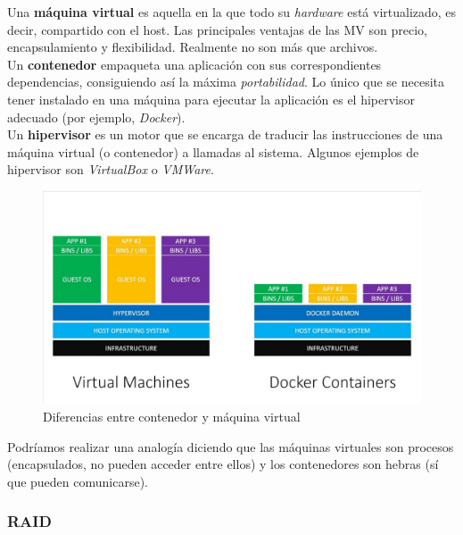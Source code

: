 \documentclass[12pt,spanish]{article}
\begin{document}
Una \textbf{máquina virtual} es aquella en la que todo su \textit{hardware} está virtualizado, es decir, compartido con el host. Las principales ventajas de las MV son precio, encapsulamiento y flexibilidad. Realmente no son más que archivos.\\

Un \textbf{contenedor} empaqueta una aplicación con sus correspondientes dependencias, consiguiendo así la máxima \textit{portabilidad}. Lo único que se necesita tener instalado en una máquina para ejecutar la aplicación es el hipervisor adecuado (por ejemplo, \textit{Docker}).\\

Un \textbf{hipervisor} es un motor que se encarga de traducir las instrucciones de una máquina virtual (o contenedor) a llamadas al sistema. Algunos ejemplos de hipervisor son \textit{VirtualBox} o \textit{VMWare}.

\begin{figure}[H]
  \centering
  \includegraphics[width=\textwidth]{contenedor_vs_vm.jpeg}
  \caption{Diferencias entre contenedor y máquina virtual}
\end{figure}
Podríamos realizar una analogía diciendo que las máquinas virtuales son procesos (encapsulados, no pueden acceder entre ellos) y los contenedores son hebras (sí que pueden comunicarse).

\subsubsection{RAID}
\end{document}
